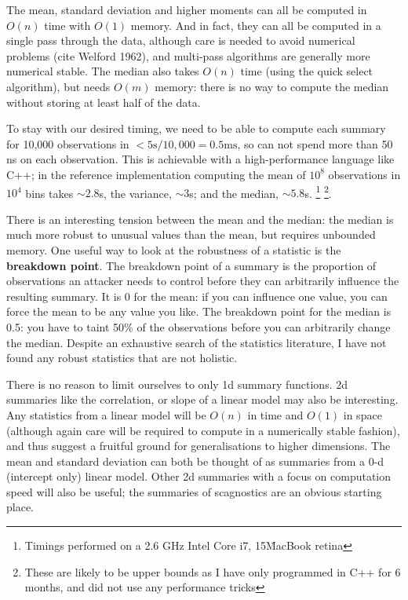 \documentclass[journal]{vgtc}                %
\begin{document}
The mean, standard deviation and higher moments can all be computed in $O(n)$ time with $O(1)$ memory. And in fact, they can all be computed in a single pass through the data, although care is needed to avoid numerical problems (cite Welford 1962), and multi-pass algorithms are generally more numerical stable. The median also takes $O(n)$ time (using the quick select algorithm), but needs $O(m)$ memory: there is no way to compute the median without storing at least half of the data.

To stay with our desired timing, we need to be able to compute each summary for 10,000 observations in $< 5 \mbox{s} / 10,000 = 0.5 \mbox{ms}$, so can not spend more than 50 ns on each observation. This is achievable with a high-performance language like C++; in the reference implementation computing the mean of $10^8$ observations in $10^4$ bins takes $\sim 2.8$s, the variance, $\sim 3$s; and the median, $\sim 5.8$s. \footnote{Timings performed on a 2.6 GHz Intel Core i7, 15\" MacBook retina} \footnote{These are likely to be upper bounds as I have only programmed in C++ for 6 months, and did not use any performance tricks}.  

There is an interesting tension between the mean and the median: the median is much more robust to unusual values than the mean, but requires unbounded memory. One useful way to look at the robustness of a statistic is the {\bf breakdown point}.  The breakdown point of a summary is the proportion of observations an attacker needs to control before they can arbitrarily influence the resulting summary. It is 0 for the mean: if you can influence one value, you can force the mean to be any value you like. The breakdown point for the median is 0.5: you have to taint 50\% of the observations before you can arbitrarily change the median.  Despite an exhaustive search of the statistics literature, I have not found any robust statistics that are not holistic.

There is no reason to limit ourselves to only 1d summary functions. 2d summaries like the correlation, or slope of a linear model may also be interesting. Any statistics from a linear model will be $O(n)$ in time and $O(1)$ in space (although again care will be required to compute in a numerically stable fashion), and thus suggest a fruitful ground for generalisations to higher dimensions.  The mean and standard deviation can both be thought of as summaries from a 0-d (intercept only) linear model. Other 2d summaries with a focus on computation speed will also be useful; the summaries of scagnostics \citep{wilkinson:2005} are an obvious starting place.
\end{document}

